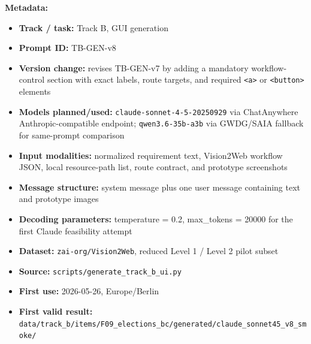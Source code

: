 \textbf{Metadata:}
\begin{itemize}
  \item \textbf{Track / task:} Track B, GUI generation
  \item \textbf{Prompt ID:} TB-GEN-v8
  \item \textbf{Version change:} revises TB-GEN-v7 by adding a mandatory
  workflow-control section with exact labels, route targets, and required
  \texttt{<a>} or \texttt{<button>} elements
  \item \textbf{Models planned/used:} \texttt{claude-sonnet-4-5-20250929}
  via ChatAnywhere Anthropic-compatible endpoint; \texttt{qwen3.6-35b-a3b}
  via GWDG/SAIA fallback for same-prompt comparison
  \item \textbf{Input modalities:} normalized requirement text, Vision2Web
  workflow JSON, local resource-path list, route contract, and prototype
  screenshots
  \item \textbf{Message structure:} system message plus one user message
  containing text and prototype images
  \item \textbf{Decoding parameters:} temperature = 0.2, max\_tokens = 20000
  for the first Claude feasibility attempt
  \item \textbf{Dataset:} \texttt{zai-org/Vision2Web}, reduced Level 1 /
  Level 2 pilot subset
  \item \textbf{Source:} \texttt{scripts/generate\_track\_b\_ui.py}
  \item \textbf{First use:} 2026-05-26, Europe/Berlin
  \item \textbf{First valid result:} \texttt{data/track\_b/items/F09\_elections\_bc/generated/claude\_sonnet45\_v8\_smoke/}
\end{itemize}

